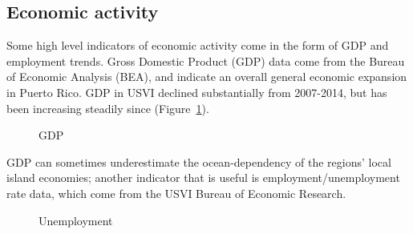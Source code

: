 \documentclass[
  letterpaper,
  oneside,
  open=any]{scrbook}
\begin{document}
\subsection{Economic activity}\label{economic-activity}

Some high level indicators of economic activity come in the form of GDP
and employment trends. Gross Domestic Product (GDP) data come from the
Bureau of Economic Analysis (BEA), and indicate an overall general
economic expansion in Puerto Rico. GDP in USVI declined substantially
from 2007-2014, but has been increasing steadily since
(Figure~\ref{fig-GDP}).

\begin{figure}


\caption{\label{fig-GDP}GDP}

\end{figure}%

GDP can sometimes underestimate the ocean-dependency of the regions'
local island economies; another indicator that is useful is
employment/unemployment rate data, which come from the USVI Bureau of
Economic Research.

\begin{figure}


\caption{\label{fig-unemp}Unemployment}

\end{figure}%
\end{document}
